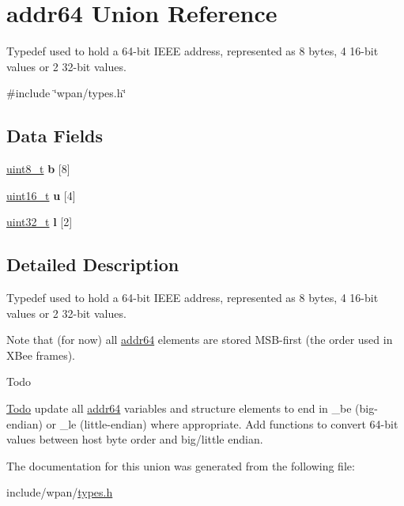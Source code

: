 \hypertarget{unionaddr64}{\section{addr64 Union Reference}
\label{unionaddr64}
}


Typedef used to hold a 64-\/bit I\-E\-E\-E address, represented as 8 bytes, 4 16-\/bit values or 2 32-\/bit values.  




{\ttfamily \#include \char`\"{}wpan/types.\-h\char`\"{}}

\subsection*{Data Fields}
\begin{DoxyCompactItemize}
\item 
\hypertarget{group__wpan__types_ga4892413ffe70d9782fc226d3512c6cd1}{\hyperlink{group__hal_gae1affc9ca37cfb624959c866a73f83c2}{uint8\-\_\-t} {\bfseries b} \mbox{[}8\mbox{]}}\label{group__wpan__types_ga4892413ffe70d9782fc226d3512c6cd1}

\item 
\hypertarget{group__wpan__types_ga14b257b19e277f41d86cef4c28a5a9b9}{\hyperlink{group__hal_ga5a8b2dc9e45a9ee81a94ef304fb62505}{uint16\-\_\-t} {\bfseries u} \mbox{[}4\mbox{]}}\label{group__wpan__types_ga14b257b19e277f41d86cef4c28a5a9b9}

\item 
\hypertarget{group__wpan__types_ga190ad535f282ae870446f52f11bb8e8c}{\hyperlink{group__hal__dos_ga09a1e304d66d35dd47daffee9731edaa}{uint32\-\_\-t} {\bfseries l} \mbox{[}2\mbox{]}}\label{group__wpan__types_ga190ad535f282ae870446f52f11bb8e8c}

\end{DoxyCompactItemize}


\subsection{Detailed Description}
Typedef used to hold a 64-\/bit I\-E\-E\-E address, represented as 8 bytes, 4 16-\/bit values or 2 32-\/bit values. 

Note that (for now) all \hyperlink{unionaddr64}{addr64} elements are stored M\-S\-B-\/first (the order used in X\-Bee frames). \begin{DoxyRefDesc}{Todo}
\item[\hyperlink{todo__todo000027}{Todo}]update all \hyperlink{unionaddr64}{addr64} variables and structure elements to end in \-\_\-be (big-\/endian) or \-\_\-le (little-\/endian) where appropriate. Add functions to convert 64-\/bit values between host byte order and big/little endian. \end{DoxyRefDesc}


The documentation for this union was generated from the following file\-:\begin{DoxyCompactItemize}
\item 
include/wpan/\hyperlink{types_8h}{types.\-h}\end{DoxyCompactItemize}
